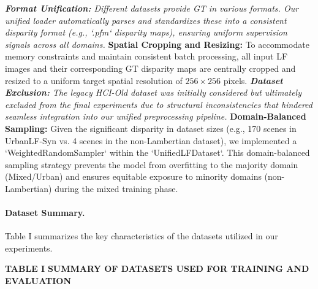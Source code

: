 \textit{   \textbf{Format Unification:} Different datasets provide GT in various formats. Our unified loader automatically parses and standardizes these into a consistent disparity format (e.g., `.pfm` disparity maps), ensuring uniform supervision signals across all domains.
}   \textbf{Spatial Cropping and Resizing:} To accommodate memory constraints and maintain consistent batch processing, all input LF images and their corresponding GT disparity maps are centrally cropped and resized to a uniform target spatial resolution of $256 \times 256$ pixels.
\textit{   \textbf{Dataset Exclusion:} The legacy HCI-Old dataset  was initially considered but ultimately excluded from the final experiments due to structural inconsistencies that hindered seamless integration into our unified preprocessing pipeline.
}   \textbf{Domain-Balanced Sampling:} Given the significant disparity in dataset sizes (e.g., 170 scenes in UrbanLF-Syn vs. 4 scenes in the non-Lambertian dataset), we implemented a `WeightedRandomSampler` within the `UnifiedLFDataset`. This domain-balanced sampling strategy prevents the model from overfitting to the majority domain (Mixed/Urban) and ensures equitable exposure to minority domains (non-Lambertian) during the mixed training phase.

\paragraph{Dataset Summary.}

Table I summarizes the key characteristics of the datasets utilized in our experiments.

\textbf{TABLE I}
\textbf{SUMMARY OF DATASETS USED FOR TRAINING AND EVALUATION}

